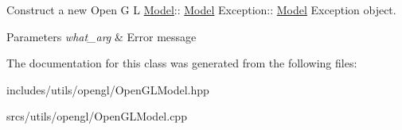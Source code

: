 Construct a new Open G L \hyperlink{class_model}{Model}\+:\+: \hyperlink{class_model}{Model} Exception\+:\+: \hyperlink{class_model}{Model} Exception object. 


\begin{DoxyParams}{Parameters}
{\em what\+\_\+arg} & Error message \\
\hline
\end{DoxyParams}


The documentation for this class was generated from the following files\+:\begin{DoxyCompactItemize}
\item 
includes/utils/opengl/Open\+G\+L\+Model.\+hpp\item 
srcs/utils/opengl/Open\+G\+L\+Model.\+cpp\end{DoxyCompactItemize}

